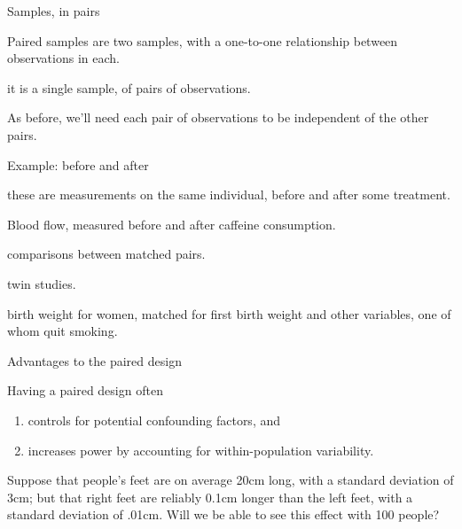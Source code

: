 \begin{frame}{Samples, in pairs}

  \begin{block}{Paired samples}
    are two samples, with a one-to-one relationship between observations in each.

    \vspace{1em}

     it is a \alert{single} sample, of \alert{pairs of observations}.
  \end{block}

    \vspace{2em}

    As before, we'll need each pair of observations to be independent of the other pairs.

\end{frame}


\begin{frame}{Example: before and after}

   these are measurements on the same individual, before and after some treatment.

    \vspace{1em}

     Blood flow, measured before and after caffeine consumption.

    \vspace{1em}
    
     comparisons between matched pairs.

    \vspace{1em}
    
     twin studies.

    \vspace{1em}
    
     birth weight for women, matched for first birth weight and other variables, one of whom quit smoking.

\end{frame}

\begin{frame}{Advantages to the paired design}

  Having a paired design often
  \begin{enumerate}
    \item controls for potential confounding factors, and
    \item increases power by accounting for within-population variability.
  \end{enumerate}

    \vspace{2em}

     Suppose that people's feet are on average 20cm long, with a standard deviation of 3cm; but that right feet are reliably 0.1cm longer than the left feet, with a standard deviation of .01cm.  Will we be able to see this effect with 100 people?

\end{frame}


